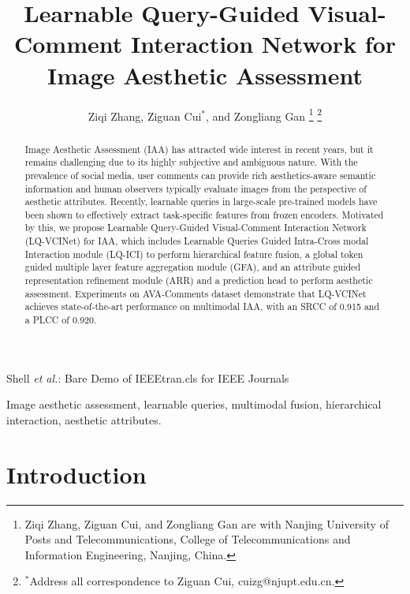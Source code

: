 \documentclass[journal]{IEEEtran}
\begin{document}
\title{Learnable Query-Guided Visual-Comment Interaction Network for Image Aesthetic Assessment}

\author{Ziqi Zhang, Ziguan Cui$^{*}$, and Zongliang Gan
\thanks{Ziqi Zhang, Ziguan Cui, and Zongliang Gan are with Nanjing University of Posts and Telecommunications, College of Telecommunications and Information Engineering, Nanjing, China.}
\thanks{$^{*}$Address all correspondence to Ziguan Cui, cuizg@njupt.edu.cn.}}

{Shell \MakeLowercase{\textit{et al.}}: Bare Demo of IEEEtran.cls for IEEE Journals}
\maketitle

\begin{abstract}
Image Aesthetic Assessment (IAA) has attracted wide interest in recent years, but it remains challenging due to its highly subjective and ambiguous nature. With the prevalence of social media, user comments can provide rich aesthetics-aware semantic information and human observers typically evaluate images from the perspective of aesthetic attributes. Recently, learnable queries in large-scale pre-trained models have been shown to effectively extract task-specific features from frozen encoders. Motivated by this, we propose Learnable Query-Guided Visual-Comment Interaction Network (LQ-VCINet) for IAA, which includes Learnable Queries Guided Intra-Cross modal Interaction module (LQ-ICI) to perform hierarchical feature fusion, a global token guided multiple layer feature aggregation module (GFA), and an attribute guided representation refinement module (ARR) and a prediction head to perform aesthetic assessment. Experiments on AVA-Comments dataset demonstrate that LQ-VCINet achieves state-of-the-art performance on multimodal IAA, with an SRCC of 0.915 and a PLCC of 0.920.
\end{abstract}
\begin{IEEEkeywords}
Image aesthetic assessment, learnable queries, multimodal fusion, hierarchical interaction, aesthetic attributes.
\end{IEEEkeywords}

\IEEEpeerreviewmaketitle

\section{Introduction}
\end{document}
